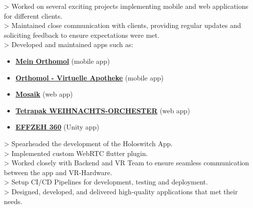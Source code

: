 \documentclass[10pt,a4paper,normalphoto]{altacv}
\begin{document}
\begin{fullwidth}
> Worked on several exciting projects implementing mobile and web applications for different clients.\\
> Maintained close communication with clients, providing regular updates and soliciting feedback to ensure expectations were met.\\
\vspace{1em}
> Developed and maintained apps such as:
\vspace{.5em}
\begin{itemize}
    \item \href{https://bit.ly/3tEGnTf}{\textbf{Mein Orthomol}} (mobile app)
    \item \href{https://bit.ly/3DfgH2S}{\textbf{Orthomol - Virtuelle Apotheke}} (mobile app)
    \item \href{https://tetra-pak-mosaik.web.app/}{\textbf{Mosaik}} (web app)
    \item \href{https://tetrapak-dabf7.web.app/}{\textbf{Tetrapak WEIHNACHTS-ORCHESTER}} (web app)
    \item \href{https://bit.ly/3DcJzJ5}{\textbf{EFFZEH 360}} (Unity app)
\end{itemize}

\vspace{1em}


\newpage


> Spearheaded the development of the Holoswitch App.\\
> Implemented custom WebRTC flutter plugin.\\
> Worked closely with Backend and VR Team to ensure seamless communication between the app and VR-Hardware.\\
> Setup CI/CD Pipelines for development, testing and deployment.\\
> Designed, developed, and delivered high-quality applications that met their needs.

\vspace{1em}


\end{fullwidth}
\end{document}
